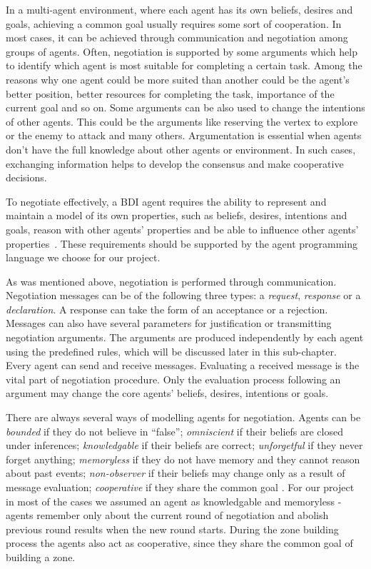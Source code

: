 In a multi-agent environment, where each agent has its own beliefs, desires and goals, achieving a common goal usually requires some sort of cooperation.
In most cases, it can be achieved through communication and negotiation among groups of agents.
Often, negotiation is supported by some arguments which help to identify which agent is most suitable for completing a certain task.
Among the reasons why one agent could be more suited than another could be the agent's better position, better resources for completing the task, importance of the current goal and so on.
Some arguments can be also used to change the intentions of other agents.
This could be the arguments like reserving the vertex to explore or the enemy to attack and many others.
Argumentation is essential when agents don't have the full knowledge about other agents or environment.
In such cases, exchanging information helps to develop the consensus and make cooperative decisions.

To negotiate effectively, a BDI agent requires the ability to represent and maintain a model of its own properties, such as beliefs, desires, intentions and goals, reason with other agents' properties and be able to influence other agents' properties~\cite{Kraus_98}.
These requirements should be supported by the agent programming language we choose for our project.

As was mentioned above, negotiation is performed through communication.
Negotiation messages can be of the following three types: a \emph{request}, \emph{response} or a \emph{declaration}.
A response can take the form of an acceptance or a rejection.
Messages can also have several parameters for justification or transmitting negotiation arguments.
The arguments are produced independently by each agent using the predefined rules, which will be discussed later in this sub-chapter.
Every agent can send and receive messages.
Evaluating a received message is the vital part of negotiation procedure.
Only the evaluation process following an argument may change the core agents' beliefs, desires, intentions or goals.

There are always several ways of modelling agents for negotiation.
Agents can be \emph{bounded} if they do not believe in ``false''; \emph{omniscient} if their beliefs are closed under inferences; \emph{knowledgable} if  their beliefs are correct; \emph{unforgetful} if they never forget anything; \emph{memoryless} if they do not have memory and they cannot reason about past events; \emph{non-observer} if their beliefs may change only as a result of message evaluation; \emph{cooperative} if they share the common goal \cite{Kraus_98}.
For our project in most of the cases we assumed an agent as knowledgable and memoryless - agents remember only about the current round of negotiation and abolish previous round results when the new round starts.
During the zone building process the agents also act as cooperative, since they share the common goal of building a zone.

